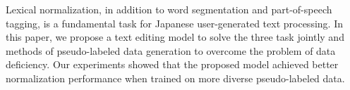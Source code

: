 Lexical normalization, in addition to word segmentation and part-of-speech tagging, is a fundamental task for Japanese user-generated text processing. In this paper, we propose a text editing model to solve the three task jointly and methods of pseudo-labeled data generation to overcome the problem of data deficiency. Our experiments showed that the proposed model achieved better normalization performance when trained on more diverse pseudo-labeled data.

